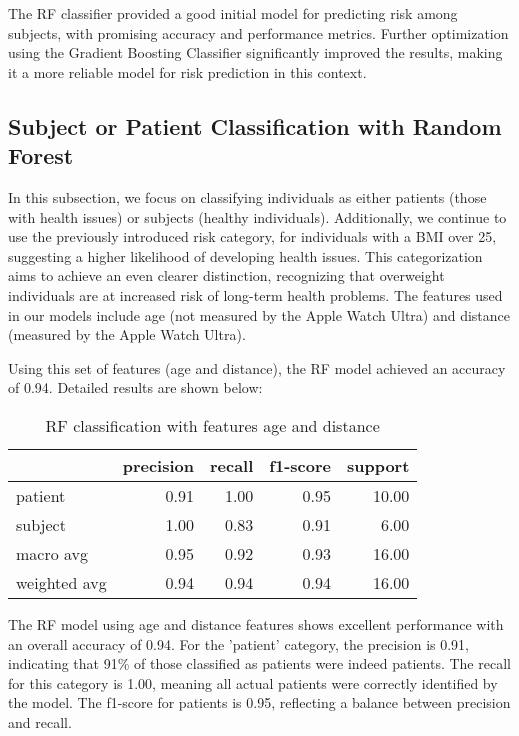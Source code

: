 The RF classifier provided a good initial model for predicting risk among subjects, with promising accuracy and performance metrics. Further optimization using the Gradient Boosting Classifier significantly improved the results, making it a more reliable model for risk prediction in this context.

\subsection{Subject or Patient Classification with Random Forest}

In this subsection, we focus on classifying individuals as either patients (those with health issues) or subjects (healthy individuals). Additionally, we continue to use the previously introduced risk category, for individuals with a BMI over 25, suggesting a higher likelihood of developing health issues. This categorization aims to achieve an even clearer distinction, recognizing that overweight individuals are at increased risk of long-term health problems. The features used in our models include age (not measured by the Apple Watch Ultra) and distance (measured by the Apple Watch Ultra).

Using this set of features (age and distance), the RF model achieved an accuracy of 0.94. Detailed results are shown below:

\FloatBarrier
\begin{table}[H]
\centering
\begin{tabular}{lrrrr}
\toprule
{} & precision & recall & f1-score & support \\
\midrule
patient & 0.91 & 1.00 & 0.95 & 10.00 \\
subject & 1.00 & 0.83 & 0.91 & 6.00 \\
macro avg & 0.95 & 0.92 & 0.93 & 16.00 \\
weighted avg & 0.94 & 0.94 & 0.94 & 16.00 \\
\bottomrule
\end{tabular}
\caption{RF classification with features age and distance}
\label{table:RFageDistance}
\end{table}
\FloatBarrier

The RF model using age and distance features shows excellent performance with an overall accuracy of 0.94. For the 'patient' category, the precision is 0.91, indicating that 91\% of those classified as patients were indeed patients. The recall for this category is 1.00, meaning all actual patients were correctly identified by the model. The f1-score for patients is 0.95, reflecting a balance between precision and recall.

